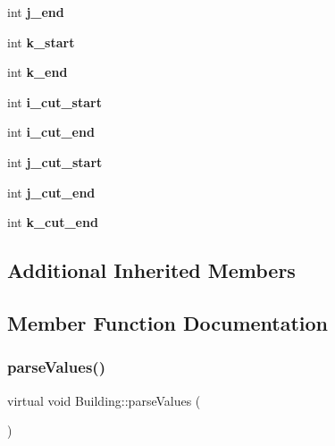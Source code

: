 \begin{DoxyCompactItemize}
int {\bfseries j\+\_\+end}
\item 
\mbox{\label{classBuilding_a6fc8960b3f733c6b74d80738692e5b6f}} 
int {\bfseries k\+\_\+start}
\item 
\mbox{\label{classBuilding_add46553b9552e66fce86eadd3d6b477f}} 
int {\bfseries k\+\_\+end}
\item 
\mbox{\label{classBuilding_af6356b3fb49ae82467c157cbfcb385ef}} 
int {\bfseries i\+\_\+cut\+\_\+start}
\item 
\mbox{\label{classBuilding_afa5671c0e1422af4f0c17f9a252c3eb0}} 
int {\bfseries i\+\_\+cut\+\_\+end}
\item 
\mbox{\label{classBuilding_a329a8d554ca99ae2b04ed29b85372a3e}} 
int {\bfseries j\+\_\+cut\+\_\+start}
\item 
\mbox{\label{classBuilding_a51d4d706d25829c43b348e0a75667bb3}} 
int {\bfseries j\+\_\+cut\+\_\+end}
\item 
\mbox{\label{classBuilding_a0a5fec2433094e4d795aebdb68c3051c}} 
int {\bfseries k\+\_\+cut\+\_\+end}
\end{DoxyCompactItemize}
\subsection*{Additional Inherited Members}


\subsection{Member Function Documentation}
\mbox{\label{classBuilding_a7782e7933a009fcfee4d186e62d34b43}} 
\subsubsection{\texorpdfstring{parse\+Values()}{parseValues()}}
{\footnotesize\ttfamily virtual void Building\+::parse\+Values (\begin{DoxyParamCaption}{ }\end{DoxyParamCaption})\hspace{0.3cm}{\ttfamily [pure virtual]}}

